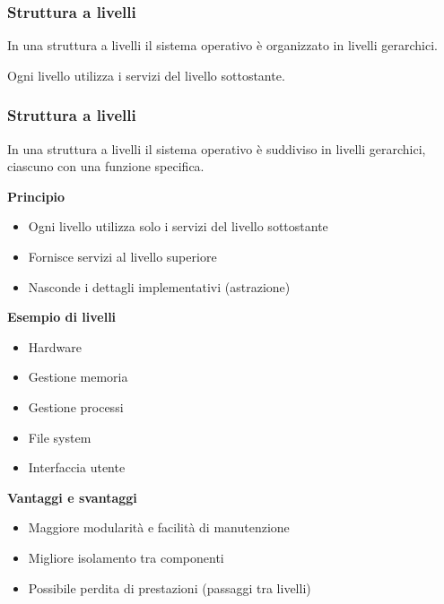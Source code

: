 \documentclass{beamer}
\begin{document}

\begin{frame}
	\frametitle{Struttura a livelli}
	
	In una struttura a livelli
	il sistema operativo è organizzato
	in livelli gerarchici.
	
	Ogni livello utilizza i servizi
	del livello sottostante.
	
\end{frame}


\begin{frame}
	\frametitle{Struttura a livelli}
	
	In una struttura a livelli il sistema operativo è suddiviso
	in livelli gerarchici, ciascuno con una funzione specifica.
	
	\vspace{0.3cm}
	
	\textbf{Principio}
	\begin{itemize}
		\item Ogni livello utilizza solo i servizi del livello sottostante
		\item Fornisce servizi al livello superiore
		\item Nasconde i dettagli implementativi (astrazione)
	\end{itemize}
	
	\vspace{0.3cm}
	
	\textbf{Esempio di livelli}
	\begin{itemize}
		\item Hardware
		\item Gestione memoria
		\item Gestione processi
		\item File system
		\item Interfaccia utente
	\end{itemize}
	
	\vspace{0.3cm}
	
	\textbf{Vantaggi e svantaggi}
	\begin{itemize}
		\item Maggiore modularità e facilità di manutenzione
		\item Migliore isolamento tra componenti
		\item Possibile perdita di prestazioni (passaggi tra livelli)
	\end{itemize}
	
\end{frame}
\end{document}
